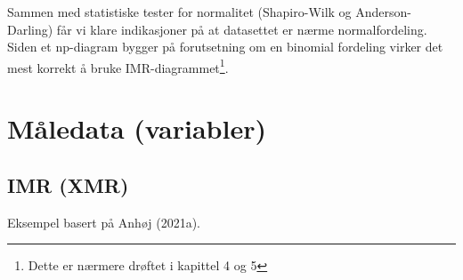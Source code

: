 \documentclass[
]{book}
\begin{document}
Sammen med statistiske tester for normalitet (Shapiro-Wilk og Anderson-Darling) får vi klare indikasjoner på at datasettet er nærme normalfordeling. Siden et np-diagram bygger på forutsetning om en binomial fordeling virker det mest korrekt å bruke IMR-diagrammet\footnote{Dette er nærmere drøftet i kapittel 4 og 5}.

\hypertarget{muxe5ledata-variabler}{%
\section{Måledata (variabler)}\label{muxe5ledata-variabler}}

\hypertarget{imr-xmr}{%
\subsection{IMR (XMR)}\label{imr-xmr}}

Eksempel basert på Anhøj (2021a).

\providecommand{\docline}[3]{\noalign{\global\setlength{\arrayrulewidth}{#1}}\arrayrulecolor[HTML]{#2}\cline{#3}}

\setlength{\tabcolsep}{2pt}

\renewcommand*{\arraystretch}{1.5}
\end{document}
